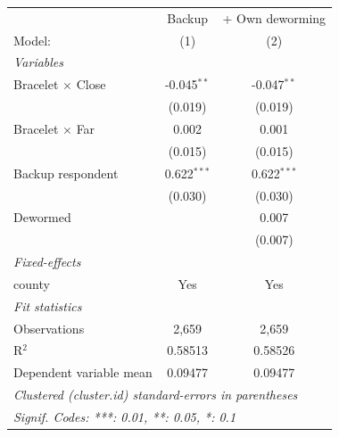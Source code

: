 
\begingroup
\centering
\begin{tabular}{lcc}
   \tabularnewline \midrule \midrule
                            & Backup        & + Own deworming \\   
   Model:                   & (1)           & (2)\\  
   \midrule
   \emph{Variables}\\
   Bracelet $\times$ Close  & -0.045$^{**}$ & -0.047$^{**}$\\   
                            & (0.019)       & (0.019)\\   
   Bracelet $\times$ Far    & 0.002         & 0.001\\   
                            & (0.015)       & (0.015)\\   
   Backup respondent        & 0.622$^{***}$ & 0.622$^{***}$\\   
                            & (0.030)       & (0.030)\\   
   Dewormed                 &               & 0.007\\   
                            &               & (0.007)\\   
   \midrule
   \emph{Fixed-effects}\\
   county                   & Yes           & Yes\\  
   \midrule
   \emph{Fit statistics}\\
   Observations             & 2,659         & 2,659\\  
   R$^2$                    & 0.58513       & 0.58526\\  
   Dependent variable mean  & 0.09477       & 0.09477\\  
   \midrule \midrule
   \multicolumn{3}{l}{\emph{Clustered (cluster.id) standard-errors in parentheses}}\\
   \multicolumn{3}{l}{\emph{Signif. Codes: ***: 0.01, **: 0.05, *: 0.1}}\\
\end{tabular}
\par\endgroup


